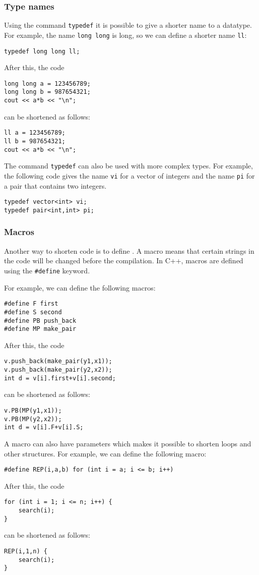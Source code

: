 \subsubsection{Type names}
Using the command \texttt{typedef}
it is possible to give a shorter name
to a datatype.
For example, the name \texttt{long long} is long,
so we can define a shorter name \texttt{ll}:
\begin{lstlisting}
typedef long long ll;
\end{lstlisting}
After this, the code
\begin{lstlisting}
long long a = 123456789;
long long b = 987654321;
cout << a*b << "\n";
\end{lstlisting}
can be shortened as follows:
\begin{lstlisting}
ll a = 123456789;
ll b = 987654321;
cout << a*b << "\n";
\end{lstlisting}

The command \texttt{typedef}
can also be used with more complex types.
For example, the following code gives
the name \texttt{vi} for a vector of integers
and the name \texttt{pi} for a pair
that contains two integers.
\begin{lstlisting}
typedef vector<int> vi;
typedef pair<int,int> pi;
\end{lstlisting}

\subsubsection{Macros}
Another way to shorten code is to define
.
A macro means that certain strings in
the code will be changed before the compilation.
In C++, macros are defined using the
\texttt{\#define} keyword.

For example, we can define the following macros:
\begin{lstlisting}
#define F first
#define S second
#define PB push_back
#define MP make_pair
\end{lstlisting}
After this, the code
\begin{lstlisting}
v.push_back(make_pair(y1,x1));
v.push_back(make_pair(y2,x2));
int d = v[i].first+v[i].second;
\end{lstlisting}
can be shortened as follows:
\begin{lstlisting}
v.PB(MP(y1,x1));
v.PB(MP(y2,x2));
int d = v[i].F+v[i].S;
\end{lstlisting}

A macro can also have parameters
which makes it possible to shorten loops and other
structures.
For example, we can define the following macro:
\begin{lstlisting}
#define REP(i,a,b) for (int i = a; i <= b; i++)
\end{lstlisting}
After this, the code
\begin{lstlisting}
for (int i = 1; i <= n; i++) {
    search(i);
}
\end{lstlisting}
can be shortened as follows:
\begin{lstlisting}
REP(i,1,n) {
    search(i);
}
\end{lstlisting}

